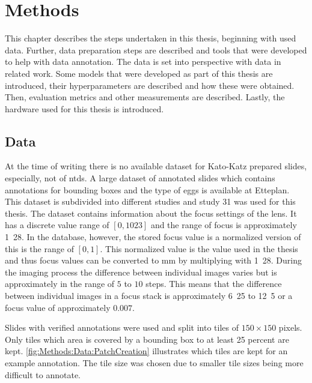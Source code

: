 \chapter{Methods}
\label{ch:Methods}

This chapter describes the steps undertaken in this thesis, beginning with used data. Further, data preparation steps are described and tools that were developed to help with data annotation. The data is set into perspective with data in related work. Some models that were developed as part of this thesis are introduced, their hyperparameters are described and how these were obtained. Then, evaluation metrics and other measurements are described. Lastly, the hardware used for this thesis is introduced. 

\section{Data}
\label{sec:Methods:Data}

At the time of writing there is no available dataset for Kato-Katz prepared slides, especially, not of \acp{ntd}. A large dataset of annotated slides which contains annotations for bounding boxes and the type of eggs is available at Etteplan. This dataset is subdivided into different studies and study 31 was used for this thesis.  
The dataset contains information about the focus settings of the lens. It has a discrete value range of $[0, 1023]$ and the range of focus is approximately \unit{1.28}{\milli\meter}. In the database, however, the stored focus value is a normalized version of this is the range of $[0,1]$. This normalized value is the value used in the thesis and thus focus values can be converted to mm by multiplying with \unit{1.28}{\milli\meter}. During the imaging process the difference between individual images varies but is approximately in the range of $5$ to $10$ steps. This means that the difference between individual images in a focus stack is approximately \unit{6.25}{\micro\meter} to \unit{12.5}{\micro\meter} or a focus value of approximately $0.007$.

Slides with verified annotations were used and split into tiles of $150 \times 150$ pixels. Only tiles which area is covered by a bounding box to at least 25 percent are kept. \autoref{fig:Methods:Data:PatchCreation} illustrates which tiles are kept for an example annotation. The tile size was chosen due to smaller tile sizes being more difficult to annotate.

